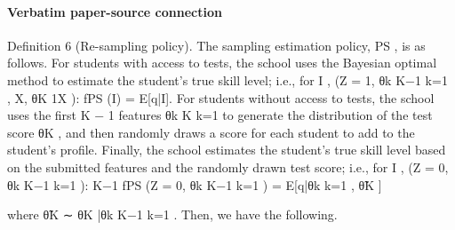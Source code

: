 \documentclass[10pt]{article}
\begin{document}
\paragraph{Verbatim paper-source connection}
\begin{ReviewVerbatim}
Definition 6 (Re-sampling policy). The sampling estimation policy, PS , is as follows.
For students with access to tests, the school uses the Bayesian optimal method to estimate the
student’s true skill level; i.e., for I , (Z = 1, {θk }K−1
k=1 , X, θK 1X ):
fPS (I) = E[q|I].
For students without access to tests, the school uses the first K − 1 features {θk }K
k=1 to generate
the distribution of the test score θK , and then randomly draws a score for each student to add to the
student’s profile. Finally, the school estimates the student’s true skill level based on the submitted
features and the randomly drawn test score; i.e., for I , (Z = 0, {θk }K−1
k=1 ):
K−1
fPS (Z = 0, {θk }K−1
k=1 ) = E[q|{θk }k=1 , θ̃K ]

where
θ̃K ∼ θK |{θk }K−1
k=1 .
Then, we have the following.
\end{ReviewVerbatim}
\end{document}
